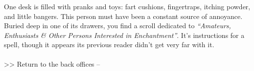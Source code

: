 One desk is filled with pranks and toys: fart cushions, fingertraps, itching powder, and little bangers. This person must have been a constant source of annoyance.\\

Buried deep in one of its drawers, you find a scroll dedicated to \emph{“Amateurs, Enthusiasts \& Other Persons Interested in Enchantment”}. It’s instructions for a spell, though it appears its previous reader didn’t get very far with it.\\
\\

>> Return to the back offices -- 